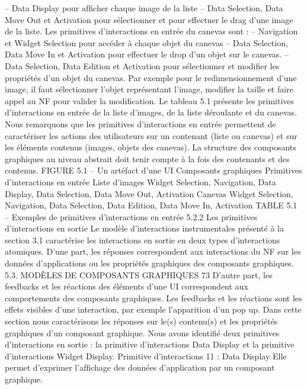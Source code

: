 \documentclass{article}
\begin{document}
– Data Display pour afﬁcher chaque image de la liste
– Data Selection, Data Move Out et Activation pour s\'{e}lectionner et pour effectuer le drag d’une
image de la liste.
Les primitives d’interactions en entr\'{e}e du canevas sont :
– Navigation et Widget Selection pour acc\'{e}der \`{a} chaque objet du canevas
– Data Selection, Data Move In et Activation pour effectuer le drop d’un objet sur le canevas.
– Data Selection, Data Edition et Activation pour s\'{e}lectionner et modiﬁer les propri\'{e}t\'{e}s d’un
objet du canevas. Par exemple pour le redimensionnement d’une image, il faut s\'{e}lectionner
l’objet repr\'{e}sentant l’image, modiﬁer la taille et faire appel au NF pour valider la modiﬁcation.
Le tableau 5.1 pr\'{e}sente les primitives d’interactions en entr\'{e}e de la liste d’images, de la liste d\'{e}roulante
et du canevas.
Nous remarquons que les primitives d’interactions en entr\'{e}e permettent de caract\'{e}riser les actions
des utilisateurs sur un contenant (liste ou canevas) et sur les \'{e}l\'{e}ments contenus (images, objets des
canevas). La structure des composants graphiques au niveau abstrait doit tenir compte \`{a} la fois des
contenants et des contenus.
FIGURE 5.1 – Un art\'{e}fact d’une UI
Composants
graphiques
Primitives d’interactions en entr\'{e}e
Liste d’images
Widget Selection, Navigation, Data Display, Data Selection, Data Move Out,
Activation
Canevas
Widget Selection, Navigation, Data Selection, Data Edition, Data Move In,
Activation
TABLE 5.1 – Exemples de primitives d’interactions en entr\'{e}e
5.2.2
Les primitives d’interactions en sortie
Le mod\`{e}le d’interactions instrumentales pr\'{e}sent\'{e} \`{a} la section 3.1 caract\'{e}rise les interactions en
sortie en deux types d’interactions atomiques. D’une part, les r\'{e}ponses correspondent aux interactions du NF sur les donn\'{e}es d’applications ou les propri\'{e}t\'{e}s graphiques des composants graphiques.
5.3. MODÈLES DE COMPOSANTS GRAPHIQUES
73
D’autre part, les feedbacks et les r\'{e}actions des \'{e}l\'{e}ments d’une UI correspondent aux comportements
des composants graphiques. Les feedbacks et les r\'{e}actions sont les effets visibles d’une interaction,
par exemple l’apparition d’un pop up.
Dans cette section nous caract\'{e}risons les r\'{e}ponses sur le(s) contenu(s) et les propri\'{e}t\'{e}s graphiques
d’un composant graphique. Nous avons identiﬁ\'{e} deux primitives d’interactions en sortie : la primitive
d’interactions Data Display et la primitive d’interactions Widget Display.
Primitive d’interactions 11 : Data Display
Elle permet d’exprimer l’afﬁchage des donn\'{e}es d’application par un composant graphique.
\end{document}
